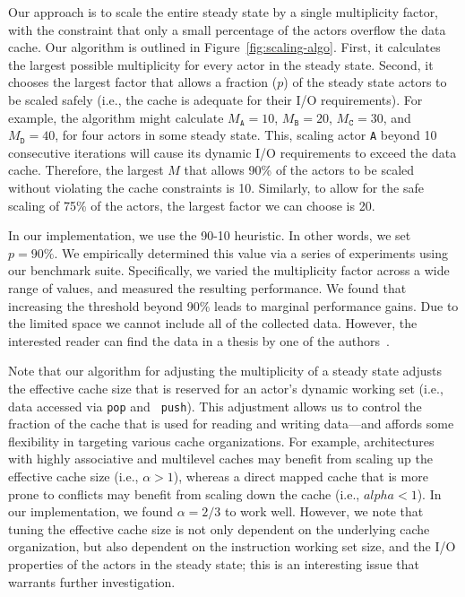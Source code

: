 Our approach is to scale the entire steady state by a single
multiplicity factor, with the constraint that only a small percentage
of the actors overflow the data cache. Our algorithm is outlined in
Figure~\ref{fig:scaling-algo}. First, it calculates the largest
possible multiplicity 
for every actor in the steady state. Second, it chooses the largest
factor that allows a fraction ($p$) of the steady state actors to be
scaled safely (i.e., the cache is adequate for their I/O
requirements).  For example, the algorithm might calculate
$M_\texttt{A} = 10$,
$M_\texttt{B} = 20$, 
$M_\texttt{C} = 30$, and 
$M_\texttt{D} = 40$, for four actors in some steady state. This,
scaling actor \texttt{A} beyond 10 consecutive iterations will cause
its dynamic I/O requirements to exceed the data cache. Therefore, the
largest $M$ that allows 90\% of the actors to be
scaled without violating the cache constraints is 10.
Similarly, to allow for the safe scaling of 75\% of the actors, the
largest factor we can choose is 20.

In our implementation, we use the 90-10 heuristic. In other words, we
set $p=90\%$. We empirically determined this value via a series of
experiments using our benchmark suite. Specifically, we varied the
multiplicity factor across a wide range of values,
and measured the resulting performance. We found that
increasing the threshold beyond 90\% leads to marginal
performance gains. Due to the limited space we cannot include all of
the collected data. However, the interested reader can find
the data in a thesis by one of the authors~\cite{janis-thesis}.

Note that our algorithm for adjusting the multiplicity of a steady
state adjusts the effective cache size that is reserved for an actor's
dynamic working set (i.e., data accessed via {\tt pop} and {\tt
push}). This adjustment allows us to control the fraction of the cache
that is used for reading and writing data---and affords some
flexibility in targeting various cache organizations.  For example,
architectures with highly associative and multilevel caches may benefit
from scaling up the effective cache size (i.e., $\alpha > 1$), whereas
a direct mapped cache that is more prone to conflicts may benefit from
scaling down the cache (i.e., $alpha < 1$). In our implementation, we
found $\alpha=2/3$ to work well. However, we note that tuning the
effective cache size is not only dependent on the underlying cache
organization, but also dependent on the instruction  working
set size, and the  I/O properties of the actors in the steady
state; this is an interesting issue that warrants further investigation.